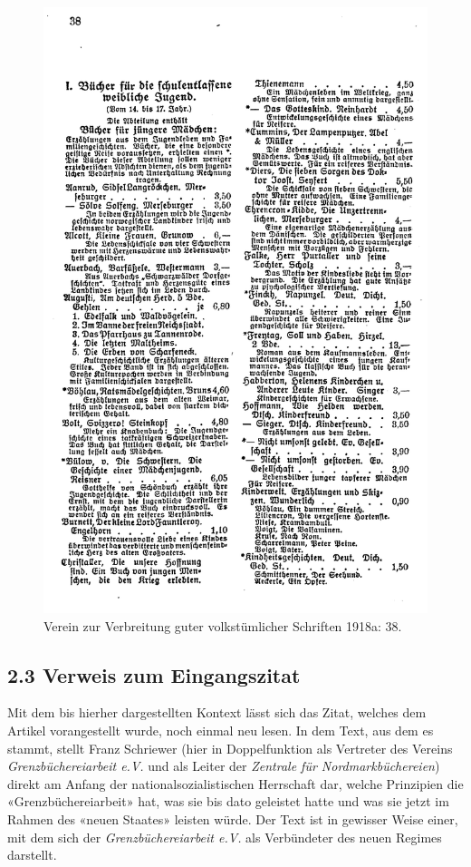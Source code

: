 \documentclass[a4paper,
fontsize=11pt,
oneside,
numbers=noperiodatend,
parskip=half-,
bibliography=totoc,
final
]{scrartcl}
\begin{document}
\begin{figure}
\centering
\includegraphics{img/buecherliste_arbeiterinnen_2.jpg}
\caption{Verein zur Verbreitung guter volkstümlicher Schriften 1918a:
38.}
\end{figure}

\hypertarget{verweis-zum-eingangszitat}{%
\subsection{2.3 Verweis zum
Eingangszitat}\label{verweis-zum-eingangszitat}}

Mit dem bis hierher dargestellten Kontext lässt sich das Zitat, welches
dem Artikel vorangestellt wurde, noch einmal neu lesen. In dem Text, aus
dem es stammt, stellt Franz Schriewer (hier in Doppelfunktion als
Vertreter des Vereins \emph{Grenzbüchereiarbeit e.V.} und als Leiter der
\emph{Zentrale für Nordmarkbüchereien}) direkt am Anfang der
nationalsozialistischen Herrschaft dar, welche Prinzipien die
«Grenzbüchereiarbeit» hat, was sie bis dato geleistet hatte und was sie
jetzt im Rahmen des «neuen Staates» leisten würde. Der Text ist in
gewisser Weise einer, mit dem sich der \emph{Grenzbüchereiarbeit e.V.}
als Verbündeter des neuen Regimes darstellt.
\end{document}
